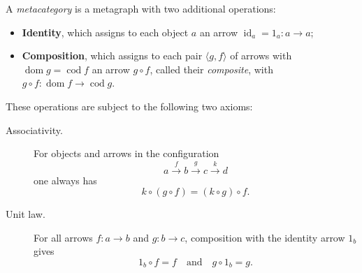 A \emph{metacategory} is a metagraph with two additional operations:

\begin{itemize}
\item \textbf{Identity}, which assigns to each object $a$ an arrow $\operatorname{id}_a = 1_a: a \to a$;
\item \textbf{Composition}, which assigns to each pair $\langle g, f \rangle$ of arrows with $\operatorname{dom} g = \operatorname{cod} f$ an arrow $g \circ f$, called their \emph{composite}, with $g \circ f: \operatorname{dom} f \to \operatorname{cod} g$.
\end{itemize}

These operations are subject to the following two axioms:

\begin{description}
\item[Associativity.] For objects and arrows in the configuration
$$a \xrightarrow{f} b \xrightarrow{g} c \xrightarrow{k} d$$
one always has
$$k \circ (g \circ f) = (k \circ g) \circ f.$$

\item[Unit law.] For all arrows $f: a \to b$ and $g: b \to c$, composition with the identity arrow $1_b$ gives
$$1_b \circ f = f \quad \text{and} \quad g \circ 1_b = g.$$
\end{description}
